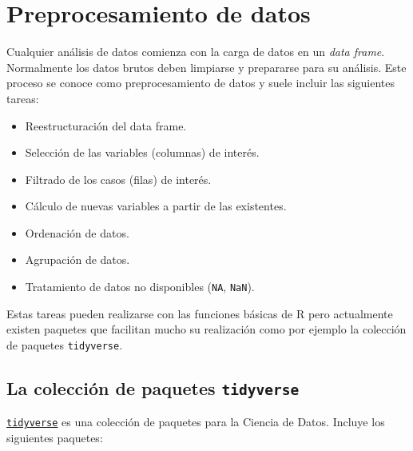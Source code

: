 \documentclass[
  spanish,
  a4paper,
]{scrreport}
\providecommand{\tightlist}{%
  \setlength{\itemsep}{0pt}\setlength{\parskip}{0pt}}
\theoremstyle{definition}
\theoremstyle{definition}
\theoremstyle{remark}
\begin{document}

\chapter{Preprocesamiento de datos}\label{preprocesamiento-de-datos}

Cualquier análisis de datos comienza con la carga de datos en un
\emph{data frame}. Normalmente los datos brutos deben limpiarse y
prepararse para su análisis. Este proceso se conoce como
preprocesamiento de datos y suele incluir las siguientes tareas:

\begin{itemize}
\tightlist
\item
  Reestructuración del data frame.
\item
  Selección de las variables (columnas) de interés.
\item
  Filtrado de los casos (filas) de interés.
\item
  Cálculo de nuevas variables a partir de las existentes.
\item
  Ordenación de datos.
\item
  Agrupación de datos.
\item
  Tratamiento de datos no disponibles (\texttt{NA}, \texttt{NaN}).
\end{itemize}

Estas tareas pueden realizarse con las funciones básicas de R pero
actualmente existen paquetes que facilitan mucho su realización como por
ejemplo la colección de paquetes \texttt{tidyverse}.

\section{\texorpdfstring{La colección de paquetes
\texttt{tidyverse}}{La colección de paquetes tidyverse}}\label{la-colecciuxf3n-de-paquetes-tidyverse}

\href{https://www.tidyverse.org/}{\texttt{tidyverse}} es una colección
de paquetes para la Ciencia de Datos. Incluye los siguientes paquetes:
\end{document}
